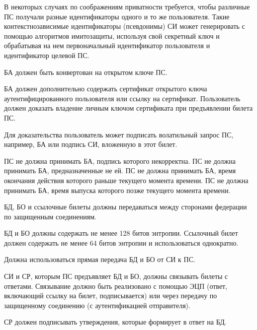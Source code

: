 \begin{note}
В некоторых случаях по соображениям приватности требуется, 
чтобы различные ПС получали разные идентификаторы одного и то же 
пользователя.
%
Такие контекстнозависимые идентификаторы (псевдонимы) СИ может генерировать
с помощью алгоритмов имитозащиты, используя свой секретный ключ и обрабатывая 
на нем первоначальный идентификатор пользователя и идентификатор целевой ПС.
\end{note}

БА должен быть конвертован на открытом ключе ПС.

БА должен дополнительно содержать сертификат открытого ключа 
аутентифицированного пользователя или ссылку на сертификат.
Пользователь должен доказать владение личным ключом сертификата
при предъявлении билета ПС.

\begin{note*}
Для доказательства пользователь может подписать волатильный запрос ПС,
например, БА или подпись СИ, вложенную в этот билет. 
\end{note*}

ПС не должна принимать БА, подпись которого некорректна.
%
ПС не должна принимать БА, предназначенные не ей.
%
ПС не должна принимать БА, время окончания действия которого раньше текущего 
момента времени.  
%
ПС не должна принимать БА, время выпуска которого позже текущего момента 
времени. 


БД, БО и ссылочные билеты должны передаваться между сторонами федерации по 
защищенным соединениям. 

БД и БО должны содержать не менее 128 битов энтропии.
% 
Ссылочный билет должен содержать не менее 64 битов энтропии 
и использоваться однократно.  

Должна использоваться прямая передача БД и БО от СИ к ПС.

СИ и СР, которым ПС предъявляет БД и БО, должны связывать билеты с ответами.
%
Связывание должно быть реализовано с помощью ЭЦП (ответ, включающий ссылку на 
билет, подписывается) или через передачу по защищенному соединению 
(с аутентификацией отправителя). 


СР должен подписывать утверждения, которые формирует в ответ на БД. 

